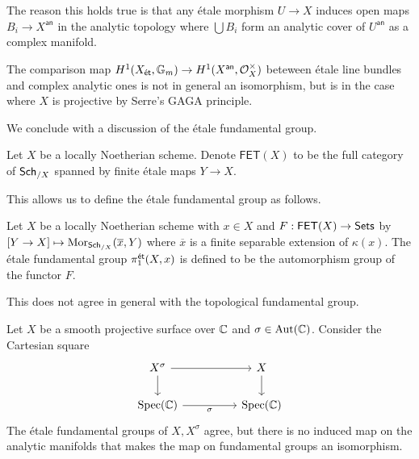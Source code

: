 The reason this holds true is that any \'{e}tale morphism $U\to X$ induces open maps $B_{i}\to X^{\mathsf{an}}$ in the analytic topology where $\bigcup B_{i}$ form an analytic cover of $U^{\mathsf{an}}$ as a complex manifold. 
\begin{remark}
    The comparison map $H^{1}(X_{\mathsf{\acute{e}t}},\mathbb{G}_{m})\to H^{1}(X^{\mathsf{an}},\mathcal{O}_{X}^{\times})$ beteween \'{e}tale line bundles and complex analytic ones is not in general an isomorphism, but is in the case where $X$ is projective by Serre's GAGA principle. 
\end{remark}
We conclude with a discussion of the \'{e}tale fundamental group. 
\begin{definition}\label{def: finite etale category}
    Let $X$ be a locally Noetherian scheme. Denote $\mathsf{FET}(X)$ to be the full category of $\mathsf{Sch}_{/X}$ spanned by finite \'{e}tale maps $Y\to X$. 
\end{definition}
This allows us to define the \'{e}tale fundamental group as follows. 
\begin{definition}\label{def: etale fundamental group}
    Let $X$ be a locally Noetherian scheme with $x\in X$ and $F:\mathsf{FET}(X)\to\mathsf{Sets}$ by $[Y\to X]\mapsto\mathrm{Mor}_{\mathsf{Sch}_{/X}}(\overline{x},Y)$ where $\overline{x}$ is a finite separable extension of $\kappa(x)$. The \'{e}tale fundamental group $\pi_{1}^{\mathsf{\acute{e}t}}(X,x)$ is defined to be the automorphism group of the functor $F$. 
\end{definition}
This does not agree in general with the topological fundamental group. 
\begin{example}
    Let $X$ be a smooth projective surface over $\mathbb{C}$ and $\sigma\in\mathrm{Aut}(\mathbb{C})$. Consider the Cartesian square 
    $$%
    \begin{tikzcd}
        {X^{\sigma}} && X \\
        {\spec(\CC)} && {\spec(\CC)}
        \arrow[from=1-1, to=1-3]
        \arrow[from=1-1, to=2-1]
        \arrow[from=1-3, to=2-3]
        \arrow["\sigma"', from=2-1, to=2-3]
    \end{tikzcd}$$
    The \'{e}tale fundamental groups of $X,X^{\sigma}$ agree, but there is no induced map on the analytic manifolds that makes the map on fundamental groups an isomorphism. 
\end{example}
